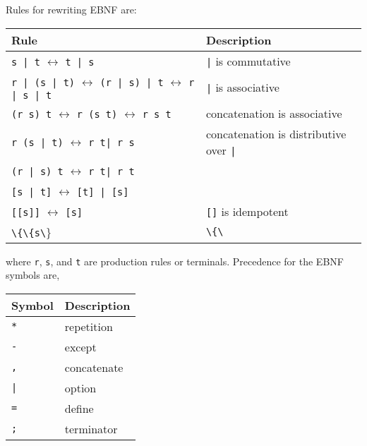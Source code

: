 Rules for rewriting EBNF are:
\begin{center}
  \begin{tabularx}{\linewidth}{|l|X|}
    \hline
    \rowcolor{headerRowColor} Rule & Description\\
    \hline
    \lstinline[language=ebnf]{s | t} $\leftrightarrow$ \lstinline[language=ebnf]{t | s} & \lstinline[language=ebnf]{|} is commutative \\
    \hline
    \lstinline[language=ebnf]{r | (s | t)} $\leftrightarrow$ \lstinline[language=ebnf]{(r | s) | t} $\leftrightarrow$ \lstinline[language=ebnf]{r | s | t} & \lstinline[language=ebnf]{|} is associative \\
    \hline
    \lstinline[language=ebnf]{(r s) t} $\leftrightarrow$ \lstinline[language=ebnf]{r (s t)} $\leftrightarrow$ \lstinline[language=ebnf]{r s t} & concatenation is associative \\
    \hline
    \lstinline[language=ebnf]{r (s | t)} $\leftrightarrow$ \lstinline[language=ebnf]{r t| r s} & concatenation is distributive over \lstinline[language=ebnf]{|}\\
    \lstinline[language=ebnf]{(r | s) t} $\leftrightarrow$ \lstinline[language=ebnf]{r t| r t} &\\
    \hline
    \lstinline[language=ebnf]{[s | t]} $\leftrightarrow$ \lstinline[language=ebnf]{[t] | [s]} &\\
    \hline
    \lstinline[language=ebnf]{[[s]]} $\leftrightarrow$ \lstinline[language=ebnf]{[s]} & \lstinline[language=ebnf]{[]} is idempotent \\
    \hline
    \lstinline[language=ebnf]{\{\{s\}\}} $\leftrightarrow$ \lstinline[language=ebnf]{\{s\}} & \lstinline[language=ebnf]{\{\}} is idempotent \\
    \hline
  \end{tabularx}
\end{center}
where \lstinline[language=ebnf]{r}, \lstinline[language=ebnf]{s}, and \lstinline[language=ebnf]{t} are production rules or terminals. Precedence for the EBNF symbols are,
\begin{center}
  \begin{tabular}{|l|l|}
    \hline
    \rowcolor{headerRowColor} Symbol & Description\\
    \hline
    \lstinline[language=ebnf]!*! & repetition\\
    \hline
    \lstinline[language=ebnf]!-! & except\\
    \hline
    \lstinline[language=ebnf]!,! & concatenate\\
    \hline
    \lstinline[language=ebnf]!|! & option\\
    \hline
    \lstinline[language=ebnf]!=! & define\\
    \hline
    \lstinline[language=ebnf]!;! & terminator\\
    \hline
  \end{tabular}
\end{center}
